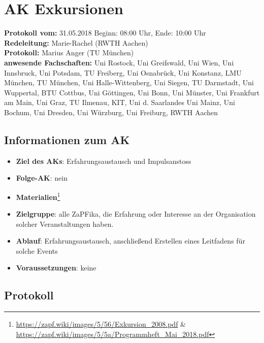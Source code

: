 
\section{AK Exkursionen}

  \textbf{Protokoll vom:} 31.05.2018
  Beginn: 08:00 Uhr,
  Ende: 10:00 Uhr \\
  \textbf{Redeleitung:} Marie-Rachel (RWTH Aachen) \\
  \textbf{Protokoll:} Marius Anger (TU München) \\
  \textbf{anwesende Fachschaften:} Uni Rostock, Uni Greifswald, Uni Wien, Uni Innsbruck, Uni Potsdam, TU Freiberg, Uni Osnabrück, Uni Konstanz, LMU München, TU München, Uni Halle-Wittenberg, Uni Siegen, TU Darmstadt, Uni Wuppertal, BTU Cottbus, Uni Göttingen, Uni Bonn, Uni Münster, Uni Frankfurt am Main, Uni Graz, TU Ilmenau, KIT, Uni d. Saarlandes Uni Mainz, Uni Bochum, Uni Dresden, Uni Würzburg, Uni Freiburg, RWTH Aachen

  \subsection*{Informationen zum AK}
    \begin{itemize}
    	\item \textbf{Ziel des AKs}: Erfahrungsaustausch und Impulsanstoss
    	\item \textbf{Folge-AK}: nein
      \item \textbf{Materialien}\footnote{\url{https://zapf.wiki/images/5/56/Exkursion_2008.pdf} \& \url{https://zapf.wiki/images/5/5a/Programmheft_Mai_2018.pdf}}
    	\item \textbf{Zielgruppe}: alle ZaPFika, die Erfahrung oder Interesse an der Organisation solcher Veranstaltungen haben.
    	\item \textbf{Ablauf}: Erfahrungsaustausch, anschließend Erstellen eines Leitfadens für solche Events
    	\item \textbf{Voraussetzungen}: keine
    \end{itemize}

  \subsection*{Protokoll}

